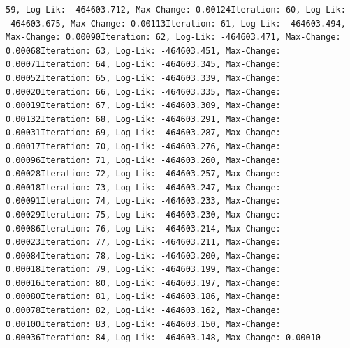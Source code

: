 \documentclass[
  man]{apa6}
\begin{document}
\begin{verbatim}
59, Log-Lik: -464603.712, Max-Change: 0.00124Iteration: 60, Log-Lik: -464603.675, Max-Change: 0.00113Iteration: 61, Log-Lik: -464603.494, Max-Change: 0.00090Iteration: 62, Log-Lik: -464603.471, Max-Change: 0.00068Iteration: 63, Log-Lik: -464603.451, Max-Change: 0.00071Iteration: 64, Log-Lik: -464603.345, Max-Change: 0.00052Iteration: 65, Log-Lik: -464603.339, Max-Change: 0.00020Iteration: 66, Log-Lik: -464603.335, Max-Change: 0.00019Iteration: 67, Log-Lik: -464603.309, Max-Change: 0.00132Iteration: 68, Log-Lik: -464603.291, Max-Change: 0.00031Iteration: 69, Log-Lik: -464603.287, Max-Change: 0.00017Iteration: 70, Log-Lik: -464603.276, Max-Change: 0.00096Iteration: 71, Log-Lik: -464603.260, Max-Change: 0.00028Iteration: 72, Log-Lik: -464603.257, Max-Change: 0.00018Iteration: 73, Log-Lik: -464603.247, Max-Change: 0.00091Iteration: 74, Log-Lik: -464603.233, Max-Change: 0.00029Iteration: 75, Log-Lik: -464603.230, Max-Change: 0.00086Iteration: 76, Log-Lik: -464603.214, Max-Change: 0.00023Iteration: 77, Log-Lik: -464603.211, Max-Change: 0.00084Iteration: 78, Log-Lik: -464603.200, Max-Change: 0.00018Iteration: 79, Log-Lik: -464603.199, Max-Change: 0.00016Iteration: 80, Log-Lik: -464603.197, Max-Change: 0.00080Iteration: 81, Log-Lik: -464603.186, Max-Change: 0.00078Iteration: 82, Log-Lik: -464603.162, Max-Change: 0.00100Iteration: 83, Log-Lik: -464603.150, Max-Change: 0.00036Iteration: 84, Log-Lik: -464603.148, Max-Change: 0.00010
\end{verbatim}
\end{document}
